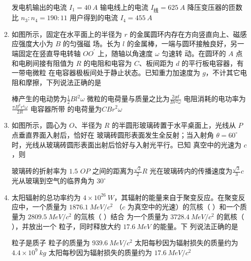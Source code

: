 \begin{enumerate}
\fourchoices
{发电机输出的电流 $ I_{1} =40 \ A $}
{输电线上的电流 $ I_{ \text{线} }=625 \ A $}
{降压变压器的匝数比 $ n_{3}:n_4=190:11 $}
{用户得到的电流 $ I_4=455 \ A $}



\item
如图所示，固定在水平面上的半径为 $ r $ 的金属圆环内存在方向竖直向上、磁感应强度大小为 $ B $ 的匀强磁
场。长为 $ l $ 的金属棒，一端与圆环接触良好，另一端固定在竖直导电转轴 $ OO ^{\prime} $ 上，随轴以角速度 $ \omega $ 匀速转
动。在圆环的 $ A $ 点和电刷间接有阻值为 $ R $ 的电阻和电容为 $ C $、板间距为 $ d $ 的平行板电容器，有一带电微粒
在电容器极板间处于静止状态。已知重力加速度为 $ g $，不计其它电阻和摩擦，下列说法正确的是  
\begin{figure}[h!]
\centering

\end{figure}


\fourchoices
{棒产生的电动势为$\frac{1}{2} B l^{2} \omega$}
{微粒的电荷量与质量之比为$\frac{2 g d}{B r^{2} \omega}$}
{电阻消耗的电功率为$\frac{\pi B^{2} r^{4} \omega}{2 R}$}
{电容器所带 的电荷量为$C B r^{2} \omega$}


\item
如图所示，圆心为 $ O $、半径为 $ R $ 的半圆形玻璃砖置于水平桌面上，光线从 $ P $ 点垂直界面入射后，恰好在
玻璃砖圆形表面发生全反射；当入射角 $ \theta=60 ^{ \circ } $ 时，光线从玻璃砖圆形表面出射后恰好与入射光平行。已知
真空中的光速为 $ c $，则  
\begin{figure}[h!]
\centering

\end{figure}


\fourchoices
{玻璃砖的折射率为 $ 1.5 $}
{$ OP $ 之间的距离为$\frac{\sqrt{2}}{2} R$}
{光在玻璃砖内的传播速度为$\frac{\sqrt{3}}{3} c$}
{光从玻璃到空气的临界角为 $ 30 ^{ \circ } $}




\item
太阳辐射的总功率约为 $ 4 \times 10^{26} \ W $，其辐射的能量来自于聚变反应。在聚变反应中，一个质量为
$ 1876.1 \ MeV/c^{2} $ （$ c $ 为真空中的光速）的氘核（  ）和一个质量为 $ 2809.5 \ MeV/c^{2} $ 的氚核（  ）结合
为一个质量为 $ 3728.4 \ MeV/c^{2} $ 的氦核（  ），并放出一个  粒子，同时释放大约 $ 17.6 \ MeV $ 的能量。下
列说法正确的是  



\fourchoices
{ 粒子是质子}
{ 粒子的质量为 $ 939.6 \ MeV/c^{2} $}
{太阳每秒因为辐射损失的质量约为 $ 4.4 \times 10^9 \ kg $}
{太阳每秒因为辐射损失的质量约为 $ 17.6 \ MeV/c^{2} $}



\end{enumerate}
